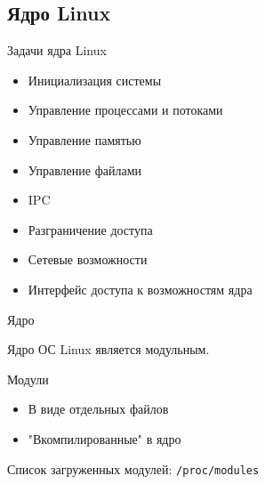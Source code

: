 \documentclass[ignorenonframetext, professionalfonts, hyperref={pdftex, unicode}]{beamer}
\begin{document}
\subsection{Ядро Linux}

\begin{frame}{Задачи ядра Linux}
	\begin{itemize}
		\item Инициализация системы
		\item Управление процессами и потоками
		\item Управление памятью
		\item Управление файлами
		\item IPC
		\item Разграничение доступа
		\item Сетевые возможности
		\item Интерфейс доступа к возможностям ядра
	\end{itemize}
\end{frame}


\begin{frame}{Ядро}

	Ядро ОС Linux является модульным. 

	\begin{block}{Модули}
		\begin{itemize}
			\item В виде отдельных файлов
			\item "Вкомпилированные" в ядро
		\end{itemize}
	\end{block}

	\bigskip

	Список загруженных модулей: {\tt /proc/modules}
\end{frame}
\end{document}

